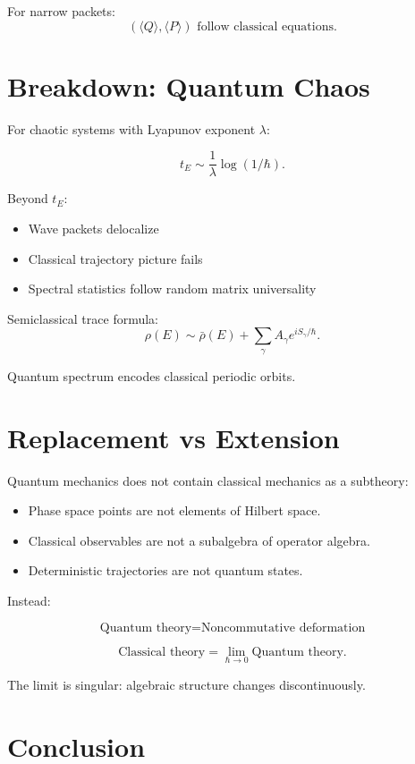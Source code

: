 \documentclass[11pt,a4paper]{article}
\begin{document}
For narrow packets:
\[
(\langle Q\rangle,\langle P\rangle)
\text{ follow classical equations}.
\]

\section{Breakdown: Quantum Chaos}

For chaotic systems with Lyapunov exponent $\lambda$:

\[
t_E \sim \frac{1}{\lambda}\log(1/\hbar).
\]

Beyond $t_E$:

\begin{itemize}
\item Wave packets delocalize
\item Classical trajectory picture fails
\item Spectral statistics follow random matrix universality
\end{itemize}

Semiclassical trace formula:
\[
\rho(E)
\sim
\bar\rho(E)
+
\sum_\gamma
A_\gamma e^{iS_\gamma/\hbar}.
\]

Quantum spectrum encodes classical periodic orbits.

\section{Replacement vs Extension}

Quantum mechanics does not contain classical mechanics as a subtheory:

\begin{itemize}
\item Phase space points are not elements of Hilbert space.
\item Classical observables are not a subalgebra of operator algebra.
\item Deterministic trajectories are not quantum states.
\end{itemize}

Instead:

\[
\text{Quantum theory} = \text{Noncommutative deformation}
\]

\[
\text{Classical theory} = \lim_{\hbar\to0} \text{Quantum theory}.
\]

The limit is singular: algebraic structure changes discontinuously.

\section{Conclusion}
\end{document}
